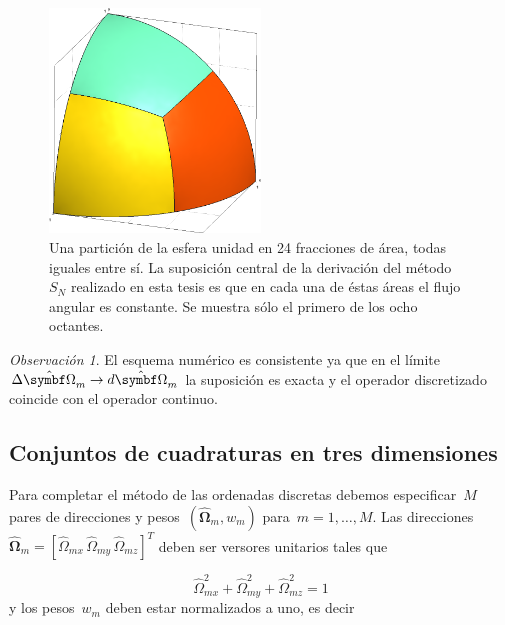 \documentclass[
  12pt,
  a4paper,
  table]{scrbook}
\theoremstyle{plain}
\theoremstyle{definition}
\theoremstyle{plain}
\theoremstyle{plain}
\theoremstyle{remark}
\newtheorem*{remark}{Observación}
\begin{document}
\begin{figure}

{\centering \includegraphics[width=0.5\textwidth,height=\textheight]{040-discretizacion/constant-per-fraction.png}

}

\caption{\label{fig-constant-per-fraction}Una partición de la esfera
unidad en 24 fracciones de área, todas iguales entre sí. La suposición
central de la derivación del método~\(S_N\) realizado en esta tesis es
que en cada una de éstas áreas el flujo angular es constante. Se muestra
sólo el primero de los ocho octantes.}

\end{figure}

\begin{remark}

El esquema numérico es consistente ya que en el
límite~\(\Delta \omegaversor_m \rightarrow d\omegaversor_m\) la
suposición es exacta y el operador discretizado coincide con el operador
continuo.

\end{remark}

\hypertarget{sec-cuadraturas}{%
\subsection{Conjuntos de cuadraturas en tres
dimensiones}\label{sec-cuadraturas}}

Para completar el método de las ordenadas discretas debemos
especificar~\(M\) pares de direcciones y
pesos~\((\boldsymbol{\hat\Omega}_m, w_m)\) para~\(m=1,\dots,M\). Las
direcciones~\(\boldsymbol{\hat\Omega}_m = [\hat{\Omega}_{mx} \, \hat{\Omega}_{my} \, \hat{\Omega}_{mz}]^T\)
deben ser versores unitarios tales que

\[\label{eq:normalizaciondirecciones}
 \hat{\Omega}_{mx}^2 + \hat{\Omega}_{my}^2 + \hat{\Omega}_{mz}^2 = 1\] y
los pesos~\(w_m\) deben estar normalizados a uno, es decir
\end{document}
